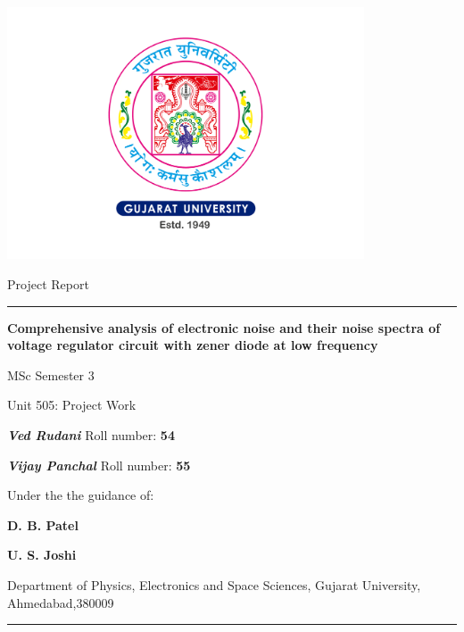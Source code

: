 


\parbox[h]{.8\textwidth}{\centering \vskip-20pt
\parbox[h]{.75\textwidth}{\centering\includegraphics[width=300pt]{GUlogo.pdf}}
    \parbox[b]{.75\textwidth}{\centering\Huge Project Report \par}\vskip10pt
    \parbox[b]{.75\textwidth}{\centering\hrule height 2pt \vskip30pt\Huge\textbf{Comprehensive analysis of electronic noise and their noise spectra of voltage regulator circuit with zener diode at low frequency}\par}\vskip20pt
   \parbox[b]{.75\textwidth}{\centering \LARGE MSc Semester $3$}\vskip7pt
    \parbox[b]{.75\textwidth}{\centering \large Unit 505:  Project Work}\vskip20pt 

    \parbox[b]{.75\textwidth}{\centering\normalsize \textbf{\emph{Ved Rudani}}   Roll number: \textbf{54}\par}\vskip2pt
    \parbox[b]{.75\textwidth}{\centering\normalsize \textbf{\emph{Vijay Panchal}}  Roll number: \textbf{55}\par}\vskip25pt

 \parbox[b]{.75\textwidth}{\centering\normalsize Under the the guidance of: }\vskip10pt

 \parbox[b]{.75\textwidth}{\centering\normalsize \Large \textbf{D. B. Patel}}\vskip10pt
 \parbox[b]{.75\textwidth}{\centering\normalsize \Large \textbf{U. S. Joshi}}\vskip10pt
 \parbox[b]{.75\textwidth}{\centering\normalsize Department of Physics, Electronics and Space Sciences, Gujarat University, Ahmedabad,380009}\vskip10pt
 \vskip20pt\hrule height 2pt
}

